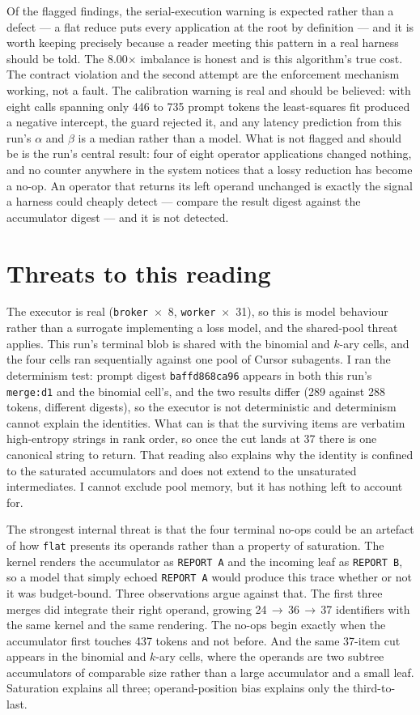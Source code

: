 \documentclass[11pt]{article}
\begin{document}
Of the flagged findings, the serial-execution warning is expected rather than a defect ---
a flat reduce puts every application at the root by definition --- and it is worth keeping
precisely because a reader meeting this pattern in a real harness should be told. The
8.00$\times$ imbalance is honest and is this algorithm's true cost. The contract violation
and the second attempt are the enforcement mechanism working, not a fault. The
calibration warning is real and should be believed: with eight calls spanning only 446 to
735 prompt tokens the least-squares fit produced a negative intercept, the guard rejected
it, and any latency prediction from this run's $\alpha$ and $\beta$ is a median rather
than a model. What is not flagged and should be is the run's central result: four of eight
operator applications changed nothing, and no counter anywhere in the system notices that
a lossy reduction has become a no-op. An operator that returns its left operand unchanged
is exactly the signal a harness could cheaply detect --- compare the result digest against
the accumulator digest --- and it is not detected.

\section{Threats to this reading}

The executor is real (\texttt{broker}~$\times$~8, \texttt{worker}~$\times$~31), so this is
model behaviour rather than a surrogate implementing a loss model, and the shared-pool
threat applies. This run's terminal blob is shared with the binomial and $k$-ary cells, and
the four cells ran sequentially against one pool of Cursor subagents. I ran the
determinism test: prompt digest \texttt{baffd868ca96} appears in both this run's
\texttt{merge:d1} and the binomial cell's, and the two results differ (289 against 288
tokens, different digests), so the executor is not deterministic and determinism cannot
explain the identities. What can is that the surviving items are verbatim high-entropy
strings in rank order, so once the cut lands at 37 there is one canonical string to
return. That reading also explains why the identity is confined to the saturated
accumulators and does not extend to the unsaturated intermediates. I cannot exclude pool
memory, but it has nothing left to account for.

The strongest internal threat is that the four terminal no-ops could be an artefact of how
\texttt{flat} presents its operands rather than a property of saturation. The kernel
renders the accumulator as \texttt{REPORT A} and the incoming leaf as \texttt{REPORT B},
so a model that simply echoed \texttt{REPORT A} would produce this trace whether or not it
was budget-bound. Three observations argue against that. The first three merges did
integrate their right operand, growing 24\,$\to$\,36\,$\to$\,37 identifiers with the same
kernel and the same rendering. The no-ops begin exactly when the accumulator first touches
437 tokens and not before. And the same 37-item cut appears in the binomial and $k$-ary
cells, where the operands are two subtree accumulators of comparable size rather than a
large accumulator and a small leaf. Saturation explains all three; operand-position bias
explains only the third-to-last.
\end{document}
